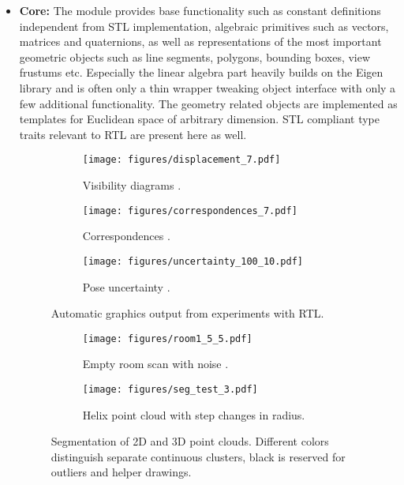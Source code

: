 \documentclass[
    letterpaper, 
    10 pt, 
    conference,
    table,
]{ieeeconf}
\begin{document}
\begin{itemize}
    \item \textbf{Core:} The module provides base functionality such as constant definitions independent from STL implementation, algebraic primitives such as vectors, matrices and quaternions, as well as representations of the most important geometric objects such as line segments, polygons, bounding boxes, view frustums etc. Especially the linear algebra part heavily builds on the Eigen library and is often only a thin wrapper tweaking object interface with only a few additional functionality. The geometry related objects are implemented as templates for Euclidean space of arbitrary dimension. STL compliant type traits relevant to RTL are present here as well.

    \begin{figure*}[t]
        \centering
        \begin{subfigure}{.32\textwidth}
            \centering
            \texttt{[image: figures/displacement\_7.pdf]}
            \caption{Visibility diagrams \cite{Jelinek2017dt}.}
        \end{subfigure}%
        \begin{subfigure}{.32\textwidth}
            \centering
            \texttt{[image: figures/correspondences\_7.pdf]}
            \caption{Correspondences \cite{Jelinek2017dt}.}
        \end{subfigure}%
        \begin{subfigure}{.32\textwidth}
            \centering
            \texttt{[image: figures/uncertainty\_100\_10.pdf]}
            \caption{Pose uncertainty \cite{Jelinek2019}.}
        \end{subfigure}
        \caption{Automatic graphics output from experiments with RTL.}
        \label{fig_auto_outut}
    \end{figure*}
    
    \begin{figure*}[t]
        \centering
        \begin{subfigure}{.45\textwidth}
            \centering
            \texttt{[image: figures/room1\_5\_5.pdf]}
            \caption{Empty room scan with noise \cite{Jelinek2017dt}.}
        \end{subfigure}%
        \begin{subfigure}{.55\textwidth}
            \centering
            \texttt{[image: figures/seg\_test\_3.pdf]}
            \caption{Helix point cloud with step changes in radius.}
        \end{subfigure}
        \caption{Segmentation of 2D and 3D point clouds. Different colors distinguish separate continuous clusters, black is reserved for outliers and helper drawings.}
        \label{fig_segmentation}
    \end{figure*}
    

\end{itemize}
\end{document}
